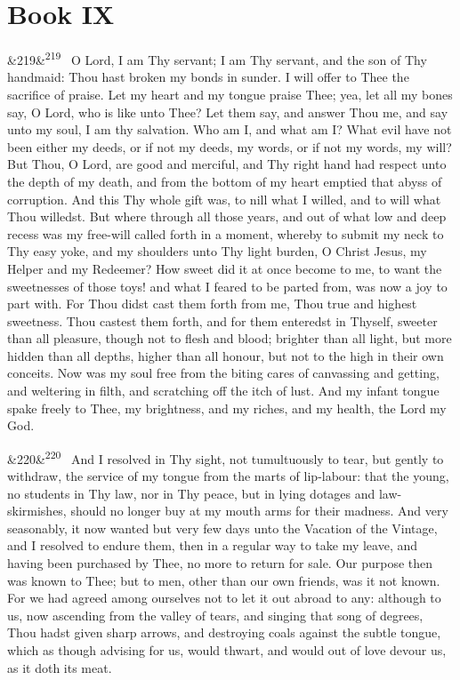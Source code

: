 \documentclass[12pt]{article}
\newcommand{\para}[1][]{\par\noindent\ifx&#1&\else\textsuperscript{\footnotesize #1}~\fi}
\begin{document}
\section*{Book IX}

\para[219] O Lord, I am Thy servant; I am Thy servant, and the son of Thy handmaid: Thou hast broken my bonds in sunder. I will offer to Thee the sacrifice of praise. Let my heart and my tongue praise Thee; yea, let all my bones say, O Lord, who is like unto Thee? Let them say, and answer Thou me, and say unto my soul, I am thy salvation. Who am I, and what am I? What evil have not been either my deeds, or if not my deeds, my words, or if not my words, my will? But Thou, O Lord, are good and merciful, and Thy right hand had respect unto the depth of my death, and from the bottom of my heart emptied that abyss of corruption. And this Thy whole gift was, to nill what I willed, and to will what Thou willedst. But where through all those years, and out of what low and deep recess was my free-will called forth in a moment, whereby to submit my neck to Thy easy yoke, and my shoulders unto Thy light burden, O Christ Jesus, my Helper and my Redeemer? How sweet did it at once become to me, to want the sweetnesses of those toys! and what I feared to be parted from, was now a joy to part with. For Thou didst cast them forth from me, Thou true and highest sweetness. Thou castest them forth, and for them enteredst in Thyself, sweeter than all pleasure, though not to flesh and blood; brighter than all light, but more hidden than all depths, higher than all honour, but not to the high in their own conceits. Now was my soul free from the biting cares of canvassing and getting, and weltering in filth, and scratching off the itch of lust. And my infant tongue spake freely to Thee, my brightness, and my riches, and my health, the Lord my God.

\para[220] And I resolved in Thy sight, not tumultuously to tear, but gently to withdraw, the service of my tongue from the marts of lip-labour: that the young, no students in Thy law, nor in Thy peace, but in lying dotages and law-skirmishes, should no longer buy at my mouth arms for their madness. And very seasonably, it now wanted but very few days unto the Vacation of the Vintage, and I resolved to endure them, then in a regular way to take my leave, and having been purchased by Thee, no more to return for sale. Our purpose then was known to Thee; but to men, other than our own friends, was it not known. For we had agreed among ourselves not to let it out abroad to any: although to us, now ascending from the valley of tears, and singing that song of degrees, Thou hadst given sharp arrows, and destroying coals against the subtle tongue, which as though advising for us, would thwart, and would out of love devour us, as it doth its meat.
\end{document}
